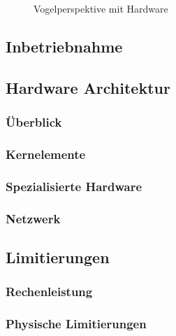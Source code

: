 \begin{figure}[h]
    \caption{Vogelperspektive mit Hardware}\label{fig:hardware}
\end{figure}

\subsection{Inbetriebnahme}

\subsection{Hardware Architektur}
\subsubsection{Überblick}
\subsubsection{Kernelemente}
\subsubsection{Spezialisierte Hardware}
\subsubsection{Netzwerk}


\subsection{Limitierungen}
\subsubsection{Rechenleistung}
\subsubsection{Physische Limitierungen}